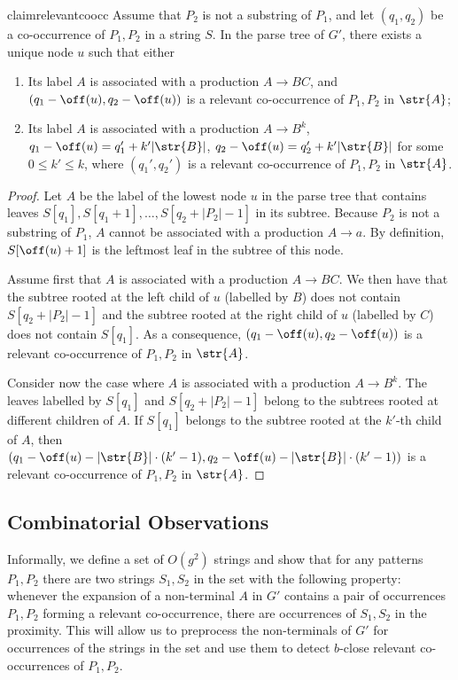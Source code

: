 \begin{restatable}{claim}{relevantcoocc}
\label{claim:relevant_cons_occ}
Assume that $P_2$ is not a substring of $P_1$, and let $(q_1,q_2)$ be a co-occurrence of $P_1, P_2$ in a string $S$. In the parse tree of $G'$, there exists a unique node $u$ such that either
\begin{enumerate}
\item Its label $A$ is associated with a production $A \rightarrow BC$, and $(q_1-\off(u),q_2-\off(u))$ is a relevant co-occurrence of $P_1,P_2$ in $\str{A}$;
\item Its label $A$ is associated with a production $A \rightarrow B^k$, $q_1-\off(u)=q_1'+k' |\str{B}|$, $q_2-\off(u)=q_2'+k' |\str{B}|$ for some $0 \le k' \le k$, where $(q_1',q_2')$ is a relevant co-occurrence of $P_1, P_2$ in $\str{A}$. 
\end{enumerate}
\end{restatable}
\begin{proof}
Let $A$ be the label of the lowest node $u$ in the parse tree that contains leaves $S[q_1], S[q_1+1], \ldots, S[q_2+|P_2|-1]$ in its subtree. Because $P_2$ is not a substring of $P_1$, $A$ cannot be associated with a production $A \rightarrow a$. By definition, $S[\off(u)+1]$ is the leftmost leaf in the subtree of this node. 

Assume first that $A$ is associated with a production $A \rightarrow BC$. We then have that the subtree rooted at the left child of $u$ (labelled by $B$) does not contain $S[q_2+|P_2|-1]$ and the subtree rooted at the right child of $u$ (labelled by $C$) does not contain $S[q_1]$. As a consequence, $(q_1-\off(u),q_2-\off(u))$ is a relevant co-occurrence of $P_1,P_2$ in $\str{A}$. 

Consider now the case where $A$ is associated with a production $A \rightarrow B^k$. The leaves labelled by $S[q_1]$ and $S[q_2+|P_2|-1]$ belong to the subtrees rooted at different children of $A$. If $S[q_1]$ belongs to the subtree rooted at the $k'$-th child of $A$, then $(q_1-\off(u)-|\str{B}| \cdot (k'-1),q_2-\off(u)-|\str{B}| \cdot (k'-1))$ is a relevant co-occurrence of $P_1,P_2$ in $\str{A}$. 
\end{proof}

\subsection{Combinatorial Observations}
Informally, we define a set of $O(g^2)$ strings and show that for any patterns $P_1,P_2$ there are two strings $S_1,S_2$ in the set with the following property: whenever the expansion of a non-terminal $A$ in $G'$ contains a pair of occurrences $P_1,P_2$ forming a relevant co-occurrence, there are occurrences of $S_1,S_2$ in the proximity. This will allow us to preprocess the non-terminals of $G'$ for occurrences of the strings in the set and use them to detect $b$-close relevant co-occurrences of $P_1,P_2$. 

